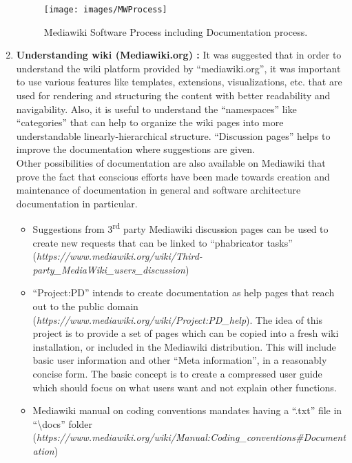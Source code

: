 \begin{enumerate}
\vspace{10mm}
\begin{figure}[H]
  \centering
  \texttt{[image: images/MWProcess]}
  \caption[Mediawiki Software Process including Documentation process]{Mediawiki Software Process including Documentation process.}\label{fig:MWProcess}
\end{figure}

\item \textbf{Understanding wiki (Mediawiki.org) : }It was suggested that in order to understand the wiki platform provided by \enquote{mediawiki.org}, it was important to use various features like templates, extensions, visualizations, etc. that are used for rendering and structuring the content with better readability and navigability. Also, it is useful to understand the \enquote{namespaces} like \enquote{categories} that can help to organize the wiki pages into more understandable linearly-hierarchical structure. \enquote{Discussion pages} helps to improve the documentation where suggestions are given.
\\\indent Other possibilities of documentation are also available on Mediawiki that prove the fact that conscious efforts have been made towards creation and maintenance of documentation in general and software architecture documentation in particular. 

\begin{itemize}

\item Suggestions from 3\textsuperscript{rd} party Mediawiki discussion pages can be used to create new requests that can be linked to \enquote{phabricator tasks} (\emph{https://www.mediawiki.org/wiki/Third-party\_MediaWiki\_users\_discussion})
\item \enquote{Project:PD} intends to create documentation as help pages that reach out to the public domain (\emph{https://www.mediawiki.org/wiki/Project:PD\_help}).
\indent The idea of this project is to provide a set of pages which can be copied into a fresh wiki installation, or included in the Mediawiki distribution. This will include basic user information and other \enquote{Meta information}, in a reasonably concise form. The basic concept is to create a compressed user guide which should focus on what users want and not explain other functions.
\item Mediawiki manual on coding conventions mandates having a \enquote{.txt} file in \enquote{\textbackslash{docs}} folder (\emph{https://www.mediawiki.org/wiki/Manual:Coding\_conventions\#Documentation})

\end{itemize}
\end{enumerate}

